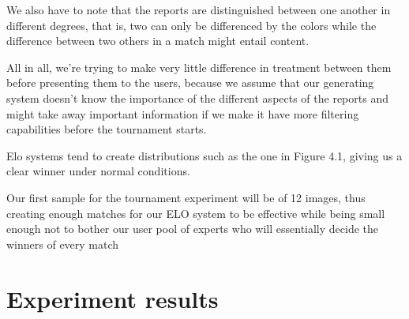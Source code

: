We also have to note that the reports are distinguished between one another in different degrees, that is, two can only be differenced by the colors while the difference between two others in a match might entail content.

All in all, we're trying to make very little difference in treatment between them before presenting them to the users, because we assume that our generating system doesn't know the importance of the different aspects of the reports and might take away important information if we make it have more filtering capabilities before the tournament starts.


Elo systems tend to create distributions such as the one in Figure 4.1, giving us a clear winner under normal conditions.

Our first sample for the tournament experiment will be of 12 images, thus creating enough matches for our ELO system to be effective while being small enough not to bother our user pool of experts who will essentially decide the winners of every match

\section{Experiment results}
\label{cap4:sec:experimentresults}
